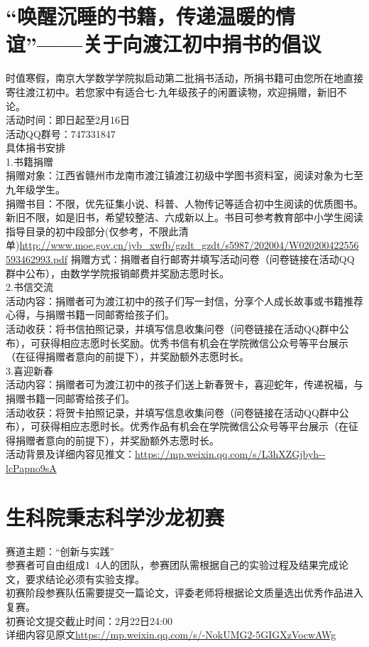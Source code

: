 \documentclass[letterpaper, 12pt]{article}
\begin{document}
\begin{multicols}{2}
\section{“唤醒沉睡的书籍，传递温暖的情谊”——关于向渡江初中捐书的倡议}
时值寒假，南京大学数学学院拟启动第二批捐书活动，所捐书籍可由您所在地直接寄往渡江初中。若您家中有适合七-九年级孩子的闲置读物，欢迎捐赠，新旧不论。\\
活动时间：即日起至2月16日\\
活动QQ群号：747331847\\
具体捐书安排\\
1.书籍捐赠\\
捐赠对象：江西省赣州市龙南市渡江镇渡江初级中学图书资料室，阅读对象为七至九年级学生。\\
捐赠书目：不限，优先征集小说、科普、人物传记等适合初中生阅读的优质图书。新旧不限，如是旧书，希望较整洁、六成新以上。书目可参考教育部中小学生阅读指导目录的初中段部分(仅参考，不限此清单)\url{http://www.moe.gov.cn/jyb_xwfb/gzdt_gzdt/s5987/202004/W020200422556593462993.pdf}
捐赠方式：捐赠者自行邮寄并填写活动问卷（问卷链接在活动QQ群中公布），由数学学院报销邮费并奖励志愿时长。\\
2.书信交流\\
活动内容：捐赠者可为渡江初中的孩子们写一封信，分享个人成长故事或书籍推荐心得，与捐赠书籍一同邮寄给孩子们。\\
活动收获：将书信拍照记录，并填写信息收集问卷（问卷链接在活动QQ群中公布），可获得相应志愿时长奖励。优秀书信有机会在学院微信公众号等平台展示（在征得捐赠者意向的前提下），并奖励额外志愿时长。\\
3.喜迎新春\\
活动内容：捐赠者可为渡江初中的孩子们送上新春贺卡，喜迎蛇年，传递祝福，与捐赠书籍一同邮寄给孩子们。\\
活动收获：将贺卡拍照记录，并填写信息收集问卷（问卷链接在活动QQ群中公布），可获得相应志愿时长。优秀作品有机会在学院微信公众号等平台展示（在征得捐赠者意向的前提下），并奖励额外志愿时长。\\
活动背景及详细内容见推文：\url{https://mp.weixin.qq.com/s/L3hXZGjbyh--lcPapno9sA}\\

\section{生科院秉志科学沙龙初赛}
赛道主题：“创新与实践”\\
参赛者可自由组成1~4人的团队，参赛团队需根据自己的实验过程及结果完成论文，要求结论必须有实验支撑。\\
初赛阶段参赛队伍需要提交一篇论文，评委老师将根据论文质量选出优秀作品进入复赛。\\
初赛论文提交截止时间：2月22日24:00 \\
详细内容见原文\url{https://mp.weixin.qq.com/s/-NokUMG2-5GIGXzVocwAWg}\\


\end{multicols}
\end{document}

